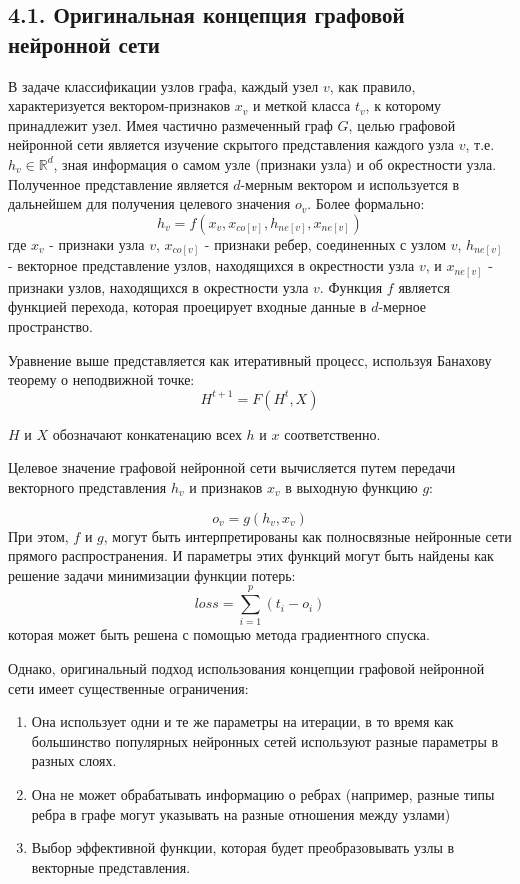 \subsection{4.1. Оригинальная концепция графовой нейронной сети}

В задаче классификации узлов графа, каждый узел $v$, как правило, характеризуется вектором-признаков $x_v$ и меткой класса $t_v$, к которому принадлежит узел. Имея частично размеченный граф $G$,
целью графовой нейронной сети является изучение скрытого представления каждого узла $v$, т.е. $h_v \in \mathbb{R}^d$, зная информация о самом узле (признаки узла) и об окрестности узла. Полученное представление является $d$-мерным вектором и используется в дальнейшем для получения целевого значения $o_v$.  Более формально:
$$
h_v = f(x_v, x_{co[v]}, h_{ne[v]}, x_{ne[v]}) 
$$
где $x_v$ - признаки узла $v$, $x_{co[v]}$ - признаки ребер, соединенных с узлом $v$, $h_{ne[v]}$ - векторное представление узлов, находящихся в окрестности узла $v$, и $x_{ne[v]}$ - признаки узлов, находящихся в окрестности узла $v$.  Функция $f$ является функцией перехода, которая проецирует входные данные в $d$-мерное пространство. 

Уравнение выше представляется как итеративный процесс, используя Банахову теорему о неподвижной точке:
$$
H^{t+1} = F(H^t, X)
$$

$H$ и $X$ обозначают конкатенацию всех $h$ и $x$ соответственно.

Целевое значение графовой нейронной сети вычисляется путем передачи векторного представления $h_v$ и признаков $x_v$ в выходную функцию $g$:

$$
o_v = g(h_v, x_v)
$$
При этом, $f$ и $g$, могут быть интерпретированы как полносвязные нейронные сети прямого распространения. И параметры этих функций могут быть найдены как решение задачи минимизации функции потерь:
$$
	loss = \sum_{i=1}^p (t_i - o_i)
$$
которая может быть решена с помощью метода градиентного спуска.

Однако, оригинальный подход использования концепции графовой нейронной сети имеет существенные ограничения:
\begin{enumerate}
\item Она использует одни и те же параметры на итерации, в то время как большинство популярных нейронных сетей используют разные параметры в разных слоях.
\item Она не может обрабатывать информацию о ребрах (например, разные типы ребра в графе могут указывать на разные отношения между узлами)
\item Выбор эффективной функции, которая будет преобразовывать узлы в векторные представления.
\end{enumerate}

